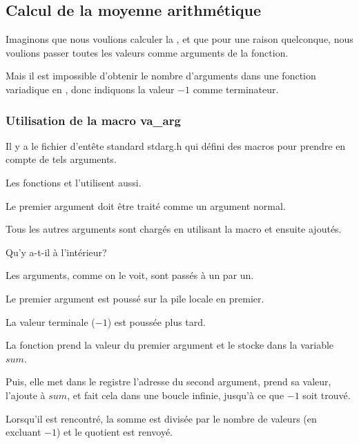 \subsection{Calcul de la moyenne arithmétique}

Imaginons que nous voulions calculer la ,
et que pour une raison quelconque, nous voulions passer toutes les valeurs comme
arguments de la fonction.

Mais il est impossible d'obtenir le nombre d'arguments dans une fonction variadique
en \CCpp, donc indiquons la valeur $-1$ comme terminateur.

\subsubsection{Utilisation de la macro va\_arg}

Il y a le fichier d'entête standard stdarg.h qui défini des macros pour prendre en
compte de tels arguments.

Les fonctions \printf et \scanf l'utilisent aussi.



Le premier argument doit être traité comme un argument normal.

Tous les autres arguments sont chargés en utilisant la macro  et ensuite
ajoutés.

Qu'y a-t-il à l'intérieur?




Les arguments, comme on le voit, sont passés à \main un par un.

Le premier argument est poussé sur la pile locale en premier.

La valeur terminale ($-1$) est poussée plus tard.

La fonction  prend la valeur du premier argument et le stocke dans
la variable $sum$.

Puis, elle met dans le registre \EDX l'adresse du second argument, prend sa valeur,
l'ajoute à $sum$, et fait cela dans une boucle infinie, jusqu'à ce que $-1$ soit
trouvé.

Lorsqu'il est rencontré, la somme est divisée par le nombre de valeurs (en excluant $-1$)
et le \gls{quotient} est renvoyé.


